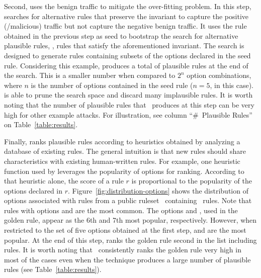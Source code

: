 \documentclass[conference]{IEEEtran}
\begin{document}


Second, \tname{} uses the benign traffic to mitigate the over-fitting
problem. In this step, \tname{} searches for alternative rules that
preserve the invariant to capture the positive (/malicious) traffic
but not capture the negative benign traffic. It uses the rule obtained
in the previous step as seed to bootstrap the search for alternative
plausible rules, \ie{}, rules that satisfy the aforementioned
invariant. The search is designed to generate rules containing subsets
of the options declared in the seed rule. Considering this example,
\tname{} produces a total of \pingscanplausible{} plausible rules at
the end of the search. This is a smaller number when compared to $2^n$
option combinations, where $n$ is the number of options contained in
the seed rule ($n=5$, in this case). \tname{} is able to prune the
search space and discard many implausible rules. It is worth noting
that the number of plausible rules that \tname\ produces at this step
can be very high for other example attacks. For illustration, see
column ``\#~Plausible Rules'' on Table~\ref{table:results}.


Finally, \tname{} ranks plausible rules according to heuristics
obtained by analyzing a database of existing rules. The general
intuition is that new rules should share characteristics with existing
human-written rules. For example, one heuristic function used by
\tname{} leverages the popularity of options for ranking. According to
that heuristic alone, the score of a rule $r$ is proportional to the
popularity of the options declared in
$r$. Figure~\ref{fig:distribution-options} shows the distribution of
options associated with rules from a public
ruleset~\cite{emerging-threats-open} containing
\numrulessuri\ rules. Note that rules with options 
and  are the most common. The options  and
, used in the golden rule, appear as the 6th and 7th
most popular, respectively. However, when restricted to the set of
five options obtained at the first step,  and
 are the most popular. At the end of this step, \tname{}
ranks the golden rule second in the list including
\pingscanplausible{} rules. It is worth noting that
\tname\ consistently ranks the golden rule very high in most of the
cases even when the technique produces a large number of plausible
rules (see Table~\ref{table:results}).
\end{document}
